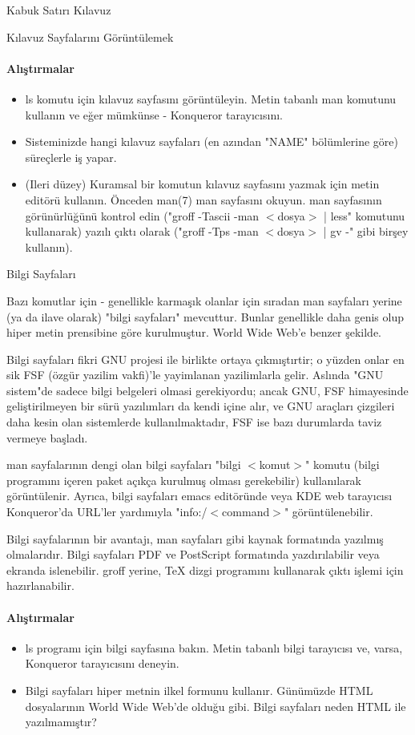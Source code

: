 \begin{section}{Kabuk Satırı Kılavuz}
\begin{subsection}{Kılavuz Sayfalarını Görüntülemek }
\paragraph{Alıştırmalar}{
\begin{itemize}
 \item ls komutu için kılavuz sayfasını görüntüleyin. Metin tabanlı man komutunu kullanın ve eğer mümkünse - Konqueror tarayıcısını.
 \item Sisteminizde hangi kılavuz sayfaları (en azından "NAME" bölümlerine göre) süreçlerle iş yapar.
 \item (Ileri düzey) Kuramsal bir komutun kılavuz sayfasını yazmak için metin editörü kullanın. Önceden man(7) man sayfasını okuyun. man sayfasının görünürlüğünü kontrol edin ("groff -Tascii -man $<$dosya$>$ | less" komutunu kullanarak) yazılı çıktı olarak ("groff -Tps -man $<$dosya$>$ | gv -" gibi birşey kullanın).
\end{itemize}}
\end{subsection}
\end{section}
\begin{section}{Bilgi Sayfaları}

Bazı komutlar için - genellikle karmaşık olanlar için sıradan man sayfaları yerine (ya da ilave olarak) "bilgi sayfaları" mevcuttur. Bunlar genellikle daha genis olup hiper metin prensibine göre kurulmuştur. World Wide Web'e benzer şekilde.

Bilgi sayfaları fikri GNU projesi ile birlikte ortaya çıkmıştırtir; o yüzden onlar en sik FSF (özgür yazilim vakfi)'le yayimlanan yazilimlarla gelir. Aslında "GNU sistem"de sadece bilgi belgeleri olmasi gerekiyordu; ancak GNU, FSF himayesinde geliştirilmeyen bir sürü yazılımları da kendi içine alır, ve GNU araçları çizgileri daha kesin olan sistemlerde kullanılmaktadır, FSF ise bazı durumlarda taviz vermeye başladı.

man sayfalarının dengi olan bilgi sayfaları "bilgi $<$komut$>$" komutu (bilgi programını içeren paket açıkça kurulmuş olması gerekebilir) kullanılarak görüntülenir. Ayrıca, bilgi sayfaları emacs editöründe veya KDE web tarayıcısı Konqueror'da URL'ler yardımıyla "info:/$<$command$>$" görüntülenebilir.

Bilgi sayfalarının bir avantajı, man sayfaları gibi kaynak formatında yazılmış olmalarıdır. Bilgi sayfaları PDF ve PostScript formatında yazdırılabilir veya ekranda islenebilir. groff yerine, \TeX{} dizgi programını kullanarak çıktı işlemi için hazırlanabilir.

\paragraph{Alıştırmalar}{
\begin{itemize}
 \item ls programı için bilgi sayfasına bakın. Metin tabanlı bilgi tarayıcısı ve, varsa, Konqueror tarayıcısını deneyin.
 \item Bilgi sayfaları hiper metnin ilkel formunu kullanır. Günümüzde HTML dosyalarının World Wide Web'de olduğu gibi. Bilgi sayfaları neden HTML ile yazılmamıştır?
\end{itemize}}
\end{section}
